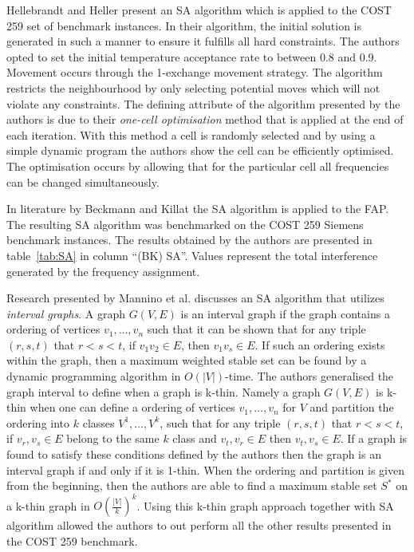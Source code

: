 Hellebrandt and Heller \cite{Hehe00} present an \gls{SA} algorithm which is applied to the COST 259 set of benchmark instances. In their algorithm, the initial solution is generated in such a manner to ensure it fulfills all hard constraints. The authors opted to set the initial temperature acceptance rate to between 0.8 and 0.9. Movement occurs through the 1-exchange movement strategy. The algorithm restricts the neighbourhood by only selecting potential moves which will not violate any constraints. The defining attribute of the algorithm presented by the authors is due to their \emph{one-cell optimisation} method that is applied at the end of each iteration. With this method a cell is randomly selected and by using a simple dynamic program the authors show the cell can be efficiently optimised. The optimisation occurs by allowing that for the particular cell all frequencies can be changed simultaneously\cite{Hehe00}. 

In literature by Beckmann and Killat\cite{BeKi99a} the \gls{SA} algorithm is applied to the \gls{FAP}. The resulting \gls{SA} algorithm was benchmarked on the \gls{COST} 259 Siemens benchmark instances. The results obtained by the authors are presented in table~\ref{tab:SA} in column ``(BK) \gls{SA}''. Values represent the total interference generated by the frequency assignment. 

Research presented by Mannino et al.\cite{MaOrRi02} discusses an \gls{SA} algorithm that utilizes \emph{interval graphs}. A graph $G(V,E)$ is an interval graph if the graph contains a ordering of vertices ${v_1,\dots,v_n}$ such that it can be shown that for any triple $(r,s,t)$ that $r < s < t$, if $v_1v_2 \in E$, then $v_1v_s \in E$. If such an ordering exists within the graph, then a maximum weighted stable set can be found by a dynamic programming algorithm in $O(|V|)$-time. The authors generalised the graph interval to define when a graph is k-thin. Namely a graph $G(V,E)$ is k-thin when one can define a ordering of vertices ${v_1,\dots,v_n}$ for $V$ and partition the ordering into $k$ classes $V^1,\dots,V^k$, such that for any triple $(r,s,t)$ that $r < s < t$, if $v_r,v_s \in E$ belong to the same $k$ class and $v_t,v_r \in E$ then $v_t,v_s \in E$. If a graph is found to satisfy these conditions defined by the authors then the graph is an interval graph if and only if it is 1-thin. When the ordering and partition is given from the beginning, then the authors are able to find a maximum stable set $S^*$ on a k-thin graph in $O(\frac{|V|}{k})^k$. Using this k-thin graph approach together with \gls{SA} algorithm allowed the authors to out perform all the other results presented in the \gls{COST} 259 benchmark. 

